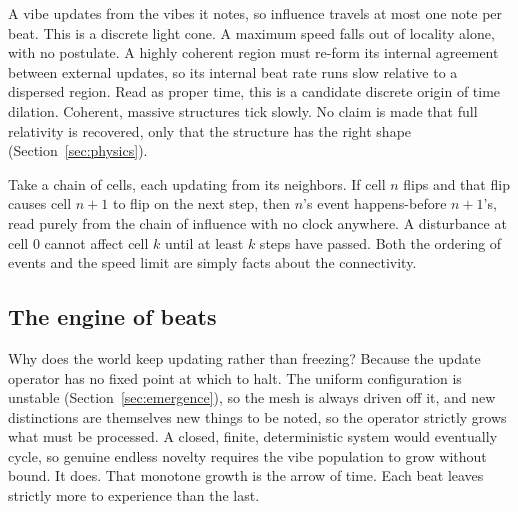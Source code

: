 A vibe updates from the vibes it notes, so influence travels at most one note per beat. This is a discrete light cone. A maximum speed falls out of locality alone, with no postulate. A highly coherent region must re-form its internal agreement between external updates, so its internal beat rate runs slow relative to a dispersed region. Read as proper time, this is a candidate discrete origin of time dilation. Coherent, massive structures tick slowly. No claim is made that full relativity is recovered, only that the structure has the right shape (Section~\ref{sec:physics}).

\begin{proposition}
Take a chain of cells, each updating from its neighbors. If cell $n$ flips and that flip causes cell $n+1$ to flip on the next step, then $n$'s event happens-before $n+1$'s, read purely from the chain of influence with no clock anywhere. A disturbance at cell $0$ cannot affect cell $k$ until at least $k$ steps have passed. Both the ordering of events and the speed limit are simply facts about the connectivity.
\end{proposition}

\subsection{The engine of beats}

Why does the world keep updating rather than freezing? Because the update operator has no fixed point at which to halt. The uniform configuration is unstable (Section~\ref{sec:emergence}), so the mesh is always driven off it, and new distinctions are themselves new things to be noted, so the operator strictly grows what must be processed. A closed, finite, deterministic system would eventually cycle, so genuine endless novelty requires the vibe population to grow without bound. It does. That monotone growth is the arrow of time. Each beat leaves strictly more to experience than the last.

